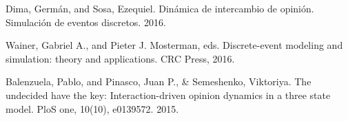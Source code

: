 \begin{thebibliography}{9}

Dima, Germán, and Sosa, Ezequiel. Dinámica de intercambio de opinión. Simulación de eventos discretos. 2016.  

Wainer, Gabriel A., and Pieter J. Mosterman, eds. Discrete-event modeling and simulation: theory and applications. CRC Press, 2016.

    Balenzuela, Pablo, and Pinasco, Juan P., \& Semeshenko, Viktoriya. The undecided have the key: Interaction-driven opinion dynamics in a three state model. PloS one, 10(10), e0139572. 2015.



\end{thebibliography}
